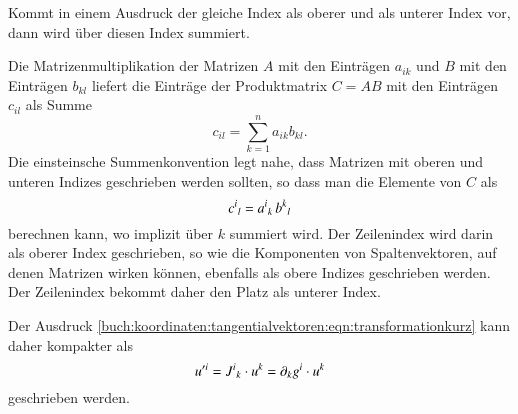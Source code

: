\begin{definition}
\label{buch:koordinaten:tangentialvektoren:def:einsteinschesummenkonvention}
%
Kommt in einem Ausdruck der gleiche Index als oberer und als unterer
Index vor, dann wird über diesen Index summiert.
\end{definition}

Die Matrizenmultiplikation der Matrizen $A$ mit den Einträgen $a_{ik}$ und
%
$B$ mit den Einträgen $b_{kl}$ liefert die Einträge der Produktmatrix
$C=AB$ mit den Einträgen $c_{il}$ als Summe
\[
c_{il}
=
\sum_{k=1}^n
a_{ik} b_{kl}.
\]
Die einsteinsche Summenkonvention legt nahe, dass Matrizen mit oberen
und unteren Indizes geschrieben werden sollten, so dass man die
Elemente von $C$ als
\[
c^i\mathstrut_l
=
a^i\mathstrut_k\,
b^k\mathstrut_l
\]
berechnen kann, wo implizit über $k$ summiert wird.
Der Zeilenindex wird darin als oberer Index geschrieben, so wie
%
die Komponenten von Spaltenvektoren, auf denen Matrizen wirken können, 
ebenfalls als obere Indizes geschrieben werden.
Der Zeilenindex bekommt daher den Platz als unterer Index.

Der Ausdruck
\eqref{buch:koordinaten:tangentialvektoren:eqn:transformationkurz}
kann daher kompakter als
\[
u^{\prime i}
=
J^i\mathstrut_k \cdot u^k
=
\partial_kg^i\cdot u^k
\]
geschrieben werden.

%
%
